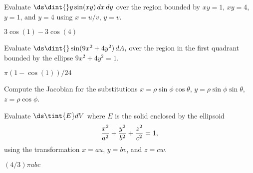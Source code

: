 \begin{exercises}
\exercise Evaluate $\ds\dint{} y\sin(xy)\,dx\,dy$ over the
region bounded by $xy=1$, $xy=4$, $y=1$, and $y=4$ using
$x=u/v$, $y=v$.
\begin{answer} $3\cos(1)-3\cos(4)$
\end{answer}

\exercise Evaluate $\ds\dint{} \sin(9x^2 + 4y^2)\,dA,$ over the region
 in the first quadrant bounded by the ellipse $9x^2+4y^2 = 1$.
\begin{answer} $\pi(1-\cos(1))/24$
\end{answer}

\exercise Compute the Jacobian for the substitutions 
$x=\rho\sin\phi\cos\theta$, $y=\rho\sin\phi\sin\theta$, 
$z=\rho\cos\phi$.

\exercise Evaluate $\ds\tint{E}dV$ where $E$ is the solid
enclosed by the ellipsoid
$${x^2\over a^2} + {y^2\over b^2} + {z^2\over c^2} = 1,$$ 
using the transformation $x=au$, $y=bv$, and $z=cw$.
\begin{answer} $(4/3)\pi abc$
\end{answer}

\end{exercises}
